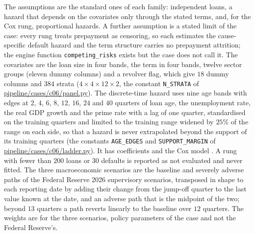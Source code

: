 The assumptions are the standard ones of each family: independent loans, a hazard that depends on the covariates only through the stated terms, and, for the Cox rung,
proportional hazards. A further assumption is a stated limit of the case: every rung treats prepayment as censoring, so each estimates the cause-specific default hazard and the term
structure carries no prepayment attrition; the engine function \texttt{competing\_risks} exists but the case does not call it. The covariates are the loan size in four bands, the term in four bands, twelve sector groups
(eleven dummy columns) and a revolver flag, which give $18$ dummy columns and $384$ strata ($4\times4\times12\times2$, the constant \texttt{N\_STRATA} of \url{pipeline/cases/c06/panel.py}). The discrete-time hazard uses nine age bands with edges at
$2$, $4$, $6$, $8$, $12$, $16$, $24$ and $40$ quarters of loan age, the unemployment rate, the real GDP growth and the prime rate with a lag of one quarter, standardised on the training
quarters and limited to the training range widened by $25\%$ of the range on each side, so that a hazard is never extrapolated beyond the support of its training quarters
(the constants \texttt{AGE\_EDGES} and \texttt{SUPPORT\_MARGIN} of \url{pipeline/cases/c06/ladder.py}). It has \pvDthCoef{} coefficients and the Cox model \pvCoxCoef{}. A rung with fewer than $200$ loans or $30$ defaults is reported as not evaluated and never fitted. The three
macroeconomic scenarios are the baseline and severely adverse paths of the Federal Reserve 2026 supervisory scenarios, transposed in shape to each reporting date by adding their
change from the jump-off quarter to the last value known at the date, and an adverse path that is the midpoint of the two; beyond $13$ quarters a path reverts linearly to the baseline over
$12$ quarters. The weights are \pvScenWeights{} for the three scenarios, policy parameters of the case and not the Federal Reserve's.

